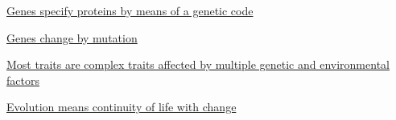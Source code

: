 \documentclass[12pt,letterpaper]{article}
\newcommand{\thetitle}{\hypertarget{home}{Essential Genetics and Genomics}}
\begin{document}
\hypertarget{1.4}{}
\begin{secbox}{\hyperlink{1}{Genes specify proteins by means of a genetic code}}{

}\end{secbox}
\hypertarget{1.5}{}
\begin{secbox}{\hyperlink{1}{Genes change by mutation}}{

}\end{secbox}
\hypertarget{1.6}{}
\begin{secbox}{\hyperlink{1}{Most traits are complex traits affected by multiple genetic and environmental factors}}{

}\end{secbox}
\hypertarget{1.7}{}
\begin{secbox}{\hyperlink{1}{Evolution means continuity of life with change}}{

}\end{secbox}

\clearpage

\renewcommand{\thetitle}{\hypertarget{2}{The Genetic Code of Genes
and Genomes}}
\hypertarget{2}{} 

\end{document}
